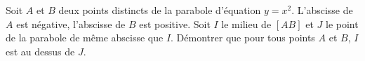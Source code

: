 
Soit $A$ et $B$ deux points distincts de la parabole d'équation $y=x^2$. L'abscisse de $A$ est négative, l'abscisse de $B$ est positive.
Soit $I$ le milieu de $[AB]$ et $J$ le point de la parabole de même abscisse que $I$. Démontrer que pour tous points $A$ et $B$, $I$ est au dessus de $J$.